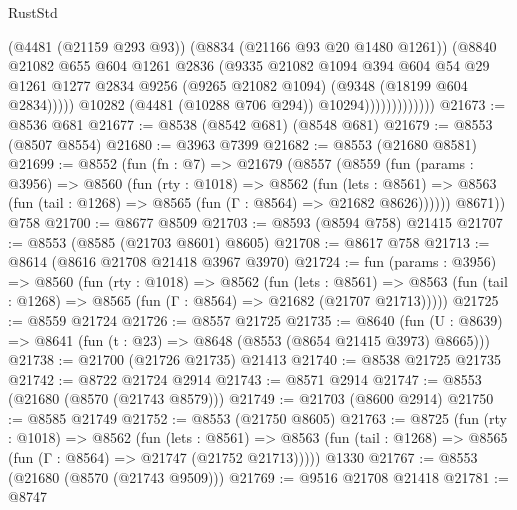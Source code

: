 \begin{lexlean}{RustStd}
\begin{coremodule}
                                (@4481 (@21159 @293 @93))
                                (@8834 (@21166 @93 @20 @1480 @1261))
                                (@8840
                                  @21082
                                  @655
                                  @604
                                  @1261
                                  @2836
                                  (@9335
                                    @21082
                                    @1094
                                    @394
                                    @604
                                    @54
                                    @29
                                    @1261
                                    @1277
                                    @2834
                                    @9256
                                    (@9265 @21082 @1094)
                                    (@9348 (@18199 @604 @2834)))))
                              @10282
                              (@4481 (@10288 @706 @294))
                              @10294)))))))))))))
@21673 := @8536 @681
@21677 := @8538 (@8542 @681) (@8548 @681)
@21679 := @8553 (@8507 @8554)
@21680 := @3963 @7399
@21682 := @8553 (@21680 @8581)
@21699 := @8552
    (fun (fn : @7) =>
    @21679
      (@8557
        (@8559
          (fun (params : @3956) =>
          @8560
            (fun (rty : @1018) =>
            @8562
              (fun (lets : @8561) =>
              @8563 (fun (tail : @1268) => @8565 (fun (Γ : @8564) => @21682 @8626))))))
        @8671))
    @758
@21700 := @8677 @8509
@21703 := @8593 (@8594 @758) @21415
@21707 := @8553 (@8585 (@21703 @8601) @8605)
@21708 := @8617 @758
@21713 := @8614 (@8616 @21708 @21418 @3967 @3970)
@21724 := fun (params : @3956) =>
  @8560
    (fun (rty : @1018) =>
    @8562
      (fun (lets : @8561) =>
      @8563 (fun (tail : @1268) => @8565 (fun (Γ : @8564) => @21682 (@21707 @21713)))))
@21725 := @8559 @21724
@21726 := @8557 @21725
@21735 := @8640
    (fun (U : @8639) => @8641 (fun (t : @23) => @8648 (@8553 (@8654 @21415 @3973) @8665)))
@21738 := @21700 (@21726 @21735) @21413
@21740 := @8538 @21725 @21735
@21742 := @8722 @21724 @2914
@21743 := @8571 @2914
@21747 := @8553 (@21680 (@8570 (@21743 @8579)))
@21749 := @21703 (@8600 @2914)
@21750 := @8585 @21749
@21752 := @8553 (@21750 @8605)
@21763 := @8725
    (fun (rty : @1018) =>
    @8562
      (fun (lets : @8561) =>
      @8563 (fun (tail : @1268) => @8565 (fun (Γ : @8564) => @21747 (@21752 @21713)))))
    @1330
@21767 := @8553 (@21680 (@8570 (@21743 @9509)))
@21769 := @9516 @21708 @21418
@21781 := @8747

\end{coremodule}
\end{lexlean}
